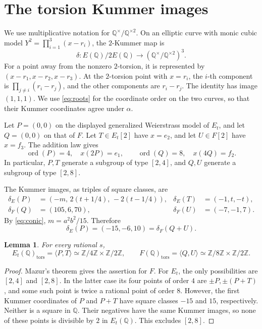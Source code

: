 \documentclass[11pt]{article}
\newtheorem{lemma}{Lemma}
\newcommand{\Q}{\mathbb Q}
\newcommand{\Z}{\mathbb Z}
\newcommand{\tors}{\mathrm{tors}}
\begin{document}
\section{The torsion Kummer images}

We use multiplicative notation for \(\Q^\times/\Q^{\times2}\).
On an elliptic curve with monic cubic model
\(Y^2=\prod_{i=1}^3(x-r_i)\), the \(2\)-Kummer map is
\[
 \delta:E(\Q)/2E(\Q)\longrightarrow
          (\Q^\times/\Q^{\times2})^3.
\]
For a point away from the nonzero \(2\)-torsion, it is represented by
\((x-r_1,x-r_2,x-r_3)\).
At the \(2\)-torsion point with \(x=r_i\), the \(i\)-th component is
\(\prod_{j\ne i}(r_i-r_j)\), and the other components are \(r_i-r_j\).
The identity has image \((1,1,1)\).
We use \eqref{eq:roots} for the coordinate order on the two curves,
so that their Kummer coordinates agree under \(\alpha\).

Let \(P=(0,0)\) on the displayed generalized Weierstrass model of \(E_t\),
and let \(Q=(0,0)\) on that of \(F\).
Let \(T\in E_t[2]\) have \(x=e_2\), and let \(U\in F[2]\)
have \(x=f_3\).
The addition law gives
\[
 \operatorname{ord}(P)=4,\quad x(2P)=e_1,\qquad
 \operatorname{ord}(Q)=8,\quad x(4Q)=f_2.
\]
In particular, \(P,T\) generate a subgroup of type \([2,4]\),
and \(Q,U\) generate a subgroup of type \([2,8]\).

The Kummer images, as triples of square classes, are
\begin{align}
 \delta_E(P)&=(-m,\,2(t+1/4),\,-2(t-1/4)),&
 \delta_E(T)&=(-1,t,-t),\label{eq:E-kummer}\\
 \delta_F(Q)&=(105,6,70),&
 \delta_F(U)&=(-7,-1,7).\label{eq:F-kummer}
\end{align}
By \eqref{eq:conic}, \(m=a^2b^2/15\). Therefore
\begin{equation}\label{eq:match}
 \delta_E(P)=(-15,-6,10)=\delta_F(Q+U).
\end{equation}

\begin{lemma}\label{lem:parents}
For every rational \(s\),
\[
 E_t(\Q)_{\tors}=\langle P,T\rangle\simeq
        \Z/4\Z\times\Z/2\Z,\qquad
 F(\Q)_{\tors}=\langle Q,U\rangle\simeq
        \Z/8\Z\times\Z/2\Z.
\]
\end{lemma}
\begin{proof}
Mazur's theorem \cite{Mazur} gives the assertion for \(F\).
For \(E_t\), the only possibilities are \([2,4]\) and \([2,8]\).
In the latter case its four points of order \(4\) are
\(\pm P,\pm(P+T)\), and some such point is twice a rational point of
order \(8\).
However, the first Kummer coordinates of \(P\) and \(P+T\)
have square classes \(-15\) and \(15\), respectively.
Neither is a square in \(\Q\). Their negatives have the same Kummer
images, so none of these points is divisible by \(2\) in \(E_t(\Q)\).
This excludes \([2,8]\).
\end{proof}
\end{document}
